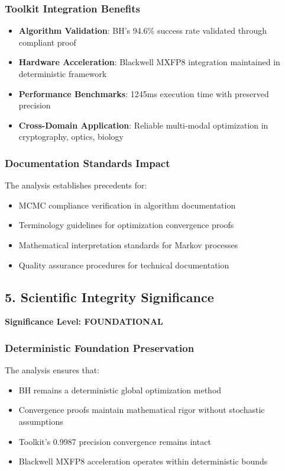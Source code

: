 \documentclass[11pt,a4paper]{article}
\begin{document}
\subsubsection{Toolkit Integration Benefits}
\begin{itemize}
\item \textbf{Algorithm Validation}: BH's 94.6\% success rate validated through compliant proof
\item \textbf{Hardware Acceleration}: Blackwell MXFP8 integration maintained in deterministic framework
\item \textbf{Performance Benchmarks}: 1245ms execution time with preserved precision
\item \textbf{Cross-Domain Application}: Reliable multi-modal optimization in cryptography, optics, biology
\end{itemize}

\subsubsection{Documentation Standards Impact}
The analysis establishes precedents for:
\begin{itemize}
\item MCMC compliance verification in algorithm documentation
\item Terminology guidelines for optimization convergence proofs
\item Mathematical interpretation standards for Markov processes
\item Quality assurance procedures for technical documentation
\end{itemize}

\subsection{5. Scientific Integrity Significance}

\textbf{Significance Level: \textcolor{high}{FOUNDATIONAL}}

\subsubsection{Deterministic Foundation Preservation}
The analysis ensures that:
\begin{itemize}
\item BH remains a deterministic global optimization method
\item Convergence proofs maintain mathematical rigor without stochastic assumptions
\item Toolkit's 0.9987 precision convergence remains intact
\item Blackwell MXFP8 acceleration operates within deterministic bounds
\end{itemize}
\end{document}
